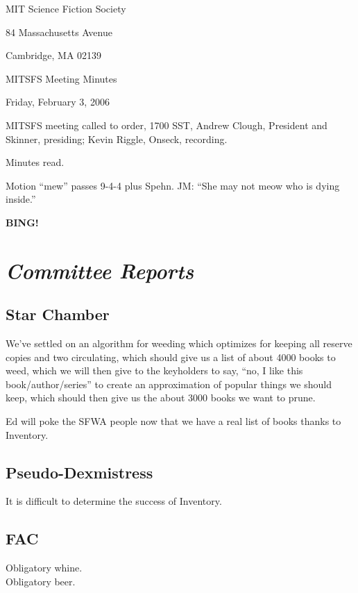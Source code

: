 \documentclass[10pt]{article}
\newcommand{\bing}{{\bf BING!} }
\newcommand{\goto}[1]{\bing \vskip 12pt \section*{{\em{#1}}}}
\newcommand{\ps}{ plus Spehn\xspace}
\begin{document}
\begin{center}

MIT Science Fiction Society

84 Massachusetts Avenue

Cambridge, MA 02139

\vspace{12pt}

MITSFS Meeting Minutes

Friday, February 3, 2006

\end{center}

\vspace{18pt}

\setlength{\parskip}{6pt}

\noindent
MITSFS meeting called to order, 1700 SST,
Andrew Clough, President and Skinner, presiding; Kevin Riggle, Onseck, recording.

Minutes read.

Motion ``mew'' passes 9-4-4\ps.  JM: ``She may not meow who is dying inside.''

\goto{Committee Reports}

\subsection*{Star Chamber}
We've settled on an algorithm for weeding which optimizes for keeping all reserve copies and two
circulating, which should give us a list of about 4000 books to weed, which we will then give to
the keyholders to say, ``no, I like this book/author/series'' to create an approximation of 
popular things we should keep, which should then give us the about 3000 books we want to prune.

Ed will poke the SFWA people now that we have a real list of books thanks to Inventory.

\subsection*{Pseudo-Dexmistress}
It is difficult to determine the success of Inventory.


\subsection*{FAC}
Obligatory whine.\\
Obligatory beer.
\end{document}
